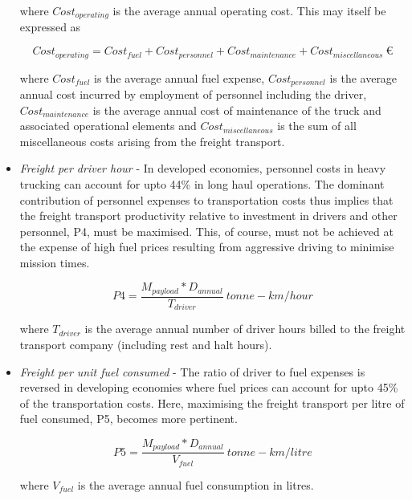 \documentclass[ExampleMasters.tex]{subfiles}
\begin{document}
\begin{itemize}
			where $Cost_{operating}$ is the average annual operating cost. This may itself be expressed as 

			\begin{equation}
				Cost_{operating} = Cost_{fuel} + Cost_{personnel} + Cost_{maintenance} + Cost_{miscellaneous} \ \euro
			\end{equation}

			where $Cost_{fuel}$ is the average annual fuel expense, $Cost_{personnel}$ is the average annual cost incurred by employment of personnel including the driver, $Cost_{maintenance}$  is the average annual cost of maintenance of the truck and associated operational elements and $Cost_{miscellaneous}$ is the sum of all miscellaneous costs arising from the freight transport.\\

			\item \textit{Freight per driver hour} - In developed economies, personnel costs in heavy trucking can account for upto 44\% in long haul operations. The dominant contribution of personnel expenses to transportation costs thus implies that the freight transport productivity relative to investment in drivers and other personnel, P4, must be maximised. This, of course, must not be achieved at the expense of high fuel prices resulting from aggressive driving to minimise mission times. 

			\begin{equation}
				P4 = \frac{M_{payload}*D_{annual}}{T_{driver}} \ tonne-km/hour
			\end{equation}

			where $T_{driver}$ is the average annual number of driver hours billed to the freight transport company (including rest and halt hours).\\

			\item \textit{Freight per unit fuel consumed} - The ratio of driver to fuel expenses is reversed in developing economies where fuel prices can account for upto 45\% of the transportation costs. Here, maximising the freight transport per litre of fuel consumed, P5, becomes more pertinent.
			
			\begin{equation}
				P5 = \frac{M_{payload}*D_{annual}}{V_{fuel}} \ tonne-km/litre
			\end{equation}

			where $V_{fuel}$ is the average annual fuel consumption in litres.\\


\end{itemize}
\end{document}
